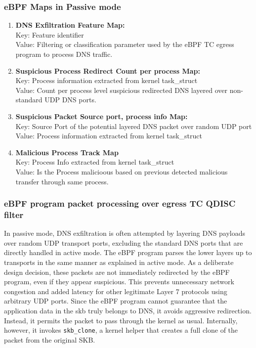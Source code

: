 \documentclass [11pt, proquest] {uwthesis}[2020/02/24]
\begin{document}
\subsubsection{\textbf{eBPF Maps in Passive mode}}
\begin{enumerate}[itemsep=1pt,parsep=0pt]
\label{passive:maps}
\item \textbf{DNS Exfiltration Feature Map:} \\
Key: Feature identifier \\
Value: Filtering or classification parameter used by the eBPF TC egress program to process DNS traffic.

\item \textbf{Suspicious Process Redirect Count per process Map:} \\
Key: Process information extracted from kernel task\_struct \\
Value: Count per process level suspicious redirected DNS layered over non-standard UDP DNS ports.

\item \textbf{Suspicious Packet Source port, process info Map:} \\
Key: Source Port of the potential layered DNS packet over random UDP port \\
Value: Process information extracted from kernel task\_struct 


\item \textbf{Malicious Process Track Map} \\
Key: Process Info extracted from kernel task\_struct \\
Value: Is the Process malicioous based on previous detected malicious transfer through same process.
\end{enumerate}





\subsubsection{\textbf{eBPF program packet processing over egress TC QDISC filter}}
\label{passive:sec1}
In passive mode, DNS exfiltration is often attempted by layering DNS payloads over random UDP transport ports, excluding the standard DNS ports that are directly handled in active mode. The eBPF program parses the lower layers up to transports in the same manner as explained in active mode. As a deliberate design decision, these packets are not immediately redirected by the eBPF program, even if they appear suspicious. This prevents unnecessary network congestion and added latency for other legitimate Layer 7 protocols using arbitrary UDP ports. Since the eBPF program cannot guarantee that the application data in the skb truly belongs to DNS, it avoids aggressive redirection. Instead, it permits the packet to pass through the kernel as usual. Internally, however, it invokes \texttt{skb\_clone}, a kernel helper that creates a full clone of the packet from the original SKB.
\end{document}
